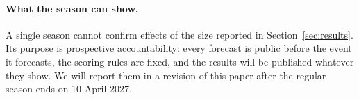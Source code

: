 \paragraph{What the season can show.}
A single season cannot confirm effects of the size reported in
Section~\ref{sec:results}. Its purpose is prospective accountability: every
forecast is public before the event it forecasts, the scoring rules are fixed,
and the results will be published whatever they show. We will report them in
a revision of this paper after the regular season ends on 10 April 2027.
